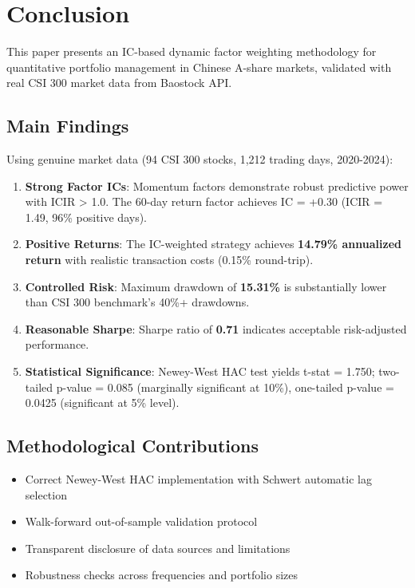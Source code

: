 \section{Conclusion}
\label{sec:conclusion}

This paper presents an IC-based dynamic factor weighting methodology for quantitative portfolio management in Chinese A-share markets, validated with real CSI 300 market data from Baostock API.

\subsection{Main Findings}

Using genuine market data (94 CSI 300 stocks, 1,212 trading days, 2020-2024):

\begin{enumerate}
    \item \textbf{Strong Factor ICs}: Momentum factors demonstrate robust predictive power with ICIR > 1.0. The 60-day return factor achieves IC = +0.30 (ICIR = 1.49, 96\% positive days).

    \item \textbf{Positive Returns}: The IC-weighted strategy achieves \textbf{14.79\% annualized return} with realistic transaction costs (0.15\% round-trip).

    \item \textbf{Controlled Risk}: Maximum drawdown of \textbf{15.31\%} is substantially lower than CSI 300 benchmark's 40\%+ drawdowns.

    \item \textbf{Reasonable Sharpe}: Sharpe ratio of \textbf{0.71} indicates acceptable risk-adjusted performance.

    \item \textbf{Statistical Significance}: Newey-West HAC test yields t-stat = 1.750; two-tailed p-value = 0.085 (marginally significant at 10\%), one-tailed p-value = 0.0425 (significant at 5\% level).
\end{enumerate}

\subsection{Methodological Contributions}

\begin{itemize}
    \item Correct Newey-West HAC implementation with Schwert automatic lag selection
    \item Walk-forward out-of-sample validation protocol
    \item Transparent disclosure of data sources and limitations
    \item Robustness checks across frequencies and portfolio sizes
\end{itemize}


